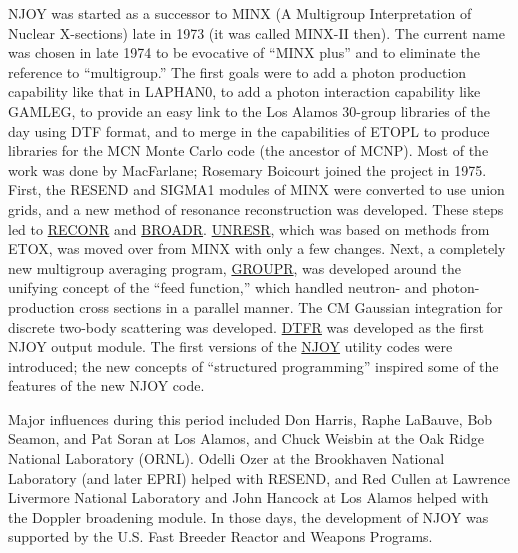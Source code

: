 NJOY was started as a successor to MINX\cite{MINX}
(A Multigroup Interpretation of Nuclear X-sections) late
in 1973 (it was called MINX-II then).  The current name was
chosen in late 1974 to be evocative of ``MINX plus'' and to
eliminate the reference to ``multigroup.''  The first
goals were to add a photon production capability like that in
LAPHAN0\cite{LAPHAN0}, to add a photon interaction
capability like GAMLEG\cite{GAMLEG}, to provide an
easy link to the Los Alamos 30-group libraries of the day using
DTF\cite{DTF} format, and to merge in the capabilities
of ETOPL\cite{ETOPL} to produce libraries for the MCN
Monte Carlo code (the ancestor of MCNP).  Most of the work was
done by MacFarlane; Rosemary Boicourt
joined the project in 1975.  First, the RESEND\cite{RESEND}
and SIGMA1\cite{SIGMA1} modules of MINX were converted
to use union grids, and a new method of resonance
reconstruction was developed.  These
steps led to \hyperlink{sRECONRhy}{RECONR}
and \hyperlink{sBROADRhy}{BROADR}.
\hyperlink{sUNRESRhy}{UNRESR}, which was based on methods
from ETOX\cite{ETOX}, was moved over from MINX with
only a few changes.  Next, a completely new multigroup averaging
program, \hyperlink{sGROUPRhy}{GROUPR},
was developed around the unifying
concept of the ``feed function,'' which handled neutron- and
photon-production cross sections in a parallel manner.  The
CM Gaussian integration for discrete two-body scattering was
developed.  \hyperlink{sDTFRhy}{DTFR}
was developed as the first NJOY output module.  The
first versions of the \hyperlink{sNJOYhy}{NJOY} utility codes were
introduced; the new concepts of ``structured programming''
 inspired some of the features
of the new NJOY code.

Major influences during this period included Don Harris,
Raphe LaBauve, Bob Seamon, and Pat
Soran at Los Alamos, and Chuck Weisbin
at the Oak Ridge National Laboratory
(ORNL).  Odelli Ozer at the Brookhaven National Laboratory
 (and later EPRI)
helped with RESEND, and Red Cullen at Lawrence Livermore National
Laboratory and John
Hancock at Los Alamos helped with the Doppler broadening module.  In those days,
the development of NJOY was supported by the U.S. Fast Breeder
Reactor and Weapons
Programs.

